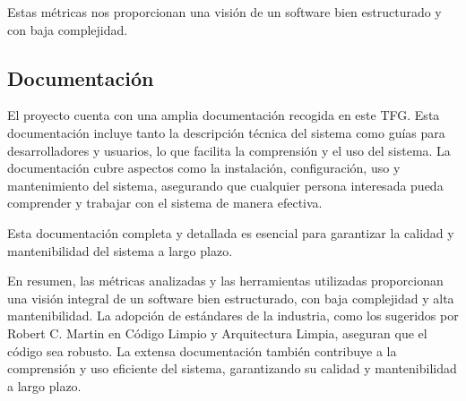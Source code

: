 Estas métricas nos proporcionan una visión de un software bien estructurado y con baja complejidad.

\subsection{Documentación}

El proyecto cuenta con una amplia documentación recogida en este TFG.
Esta documentación incluye tanto la descripción técnica del sistema como guías para desarrolladores y usuarios, lo que
facilita la comprensión y el uso del sistema.
La documentación cubre aspectos como la instalación, configuración, uso y mantenimiento del sistema, asegurando que
cualquier persona interesada pueda comprender y trabajar con el sistema de manera efectiva.

Esta documentación completa y detallada es esencial para garantizar la calidad y mantenibilidad del sistema a largo
plazo.

En resumen, las métricas analizadas y las herramientas utilizadas proporcionan una visión integral de un software bien
estructurado, con baja complejidad y alta mantenibilidad.
La adopción de estándares de la industria, como los sugeridos por Robert C. Martin en Código Limpio y Arquitectura
Limpia, aseguran que el código sea robusto.
La extensa documentación también contribuye a la comprensión y uso eficiente del sistema, garantizando su calidad y
mantenibilidad a largo plazo.












